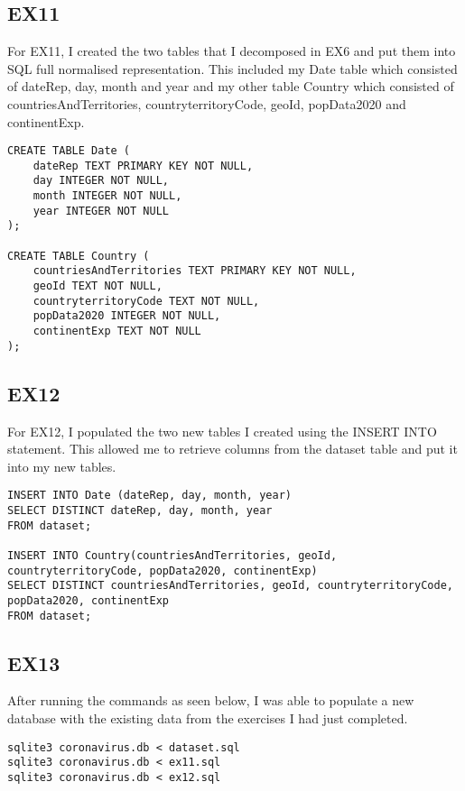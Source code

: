 \documentclass[]{article}
\begin{document}
\subsection{EX11}

For EX11, I created the two tables that I decomposed in EX6 and put them into SQL full normalised representation. This included
my Date table which consisted of dateRep, day, month and year and my other table Country which consisted of countriesAndTerritories, countryterritoryCode, geoId, popData2020 and continentExp.

\lstset{style=code}
\begin{lstlisting}
CREATE TABLE Date (
    dateRep TEXT PRIMARY KEY NOT NULL,
    day INTEGER NOT NULL,
    month INTEGER NOT NULL,
    year INTEGER NOT NULL
);

CREATE TABLE Country (
    countriesAndTerritories TEXT PRIMARY KEY NOT NULL,
    geoId TEXT NOT NULL,
    countryterritoryCode TEXT NOT NULL,
    popData2020 INTEGER NOT NULL,
    continentExp TEXT NOT NULL
);
\end{lstlisting}

\subsection{EX12}

For EX12, I populated the two new tables I created using the INSERT INTO statement. This allowed me to retrieve
columns from the dataset table and put it into my new tables.

\begin{lstlisting}
INSERT INTO Date (dateRep, day, month, year)
SELECT DISTINCT dateRep, day, month, year
FROM dataset;

INSERT INTO Country(countriesAndTerritories, geoId, countryterritoryCode, popData2020, continentExp)
SELECT DISTINCT countriesAndTerritories, geoId, countryterritoryCode, popData2020, continentExp
FROM dataset;
\end{lstlisting}

\subsection{EX13}

After running the commands as seen below, I was able to populate a new database with the existing data from the exercises I had just completed.

\begin{lstlisting}
sqlite3 coronavirus.db < dataset.sql
sqlite3 coronavirus.db < ex11.sql
sqlite3 coronavirus.db < ex12.sql
\end{lstlisting}
\end{document}
